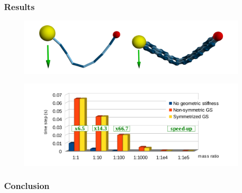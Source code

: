 \documentclass[serif,mathserif]{beamer}
\begin{document}
\begin{frame}
 \frametitle{Results}
 \begin{figure}
  \centering
  \includegraphics[scale=0.25]{img/cables.png}
 \end{figure}
 \begin{figure}
  \centering
  \includegraphics[scale=0.25]{img/statistics.png}
 \end{figure}
\end{frame}

\begin{frame}
 \frametitle{Conclusion}
\end{frame}

\begin{frame} 
\end{frame}
\end{document}
